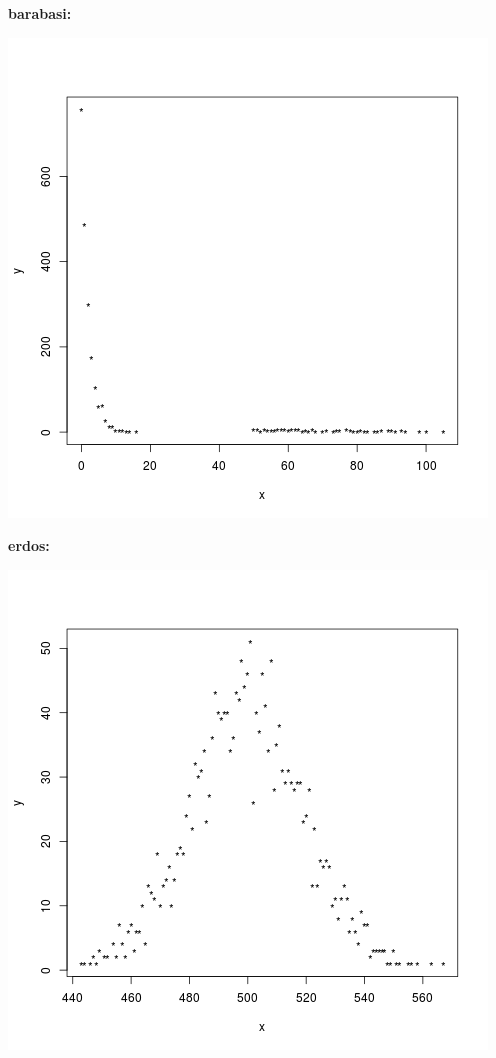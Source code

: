\documentclass[palatino,nochap]{apuntes}
\begin{document}
\textbf{barabasi:}

\begin{center}
	\includegraphics[scale=0.45]{img/barabasi_grado}
\end{center}


\textbf{erdos:}

\begin{center}
	\includegraphics[scale=0.45]{img/erdos_grado}
\end{center}
\end{document}
